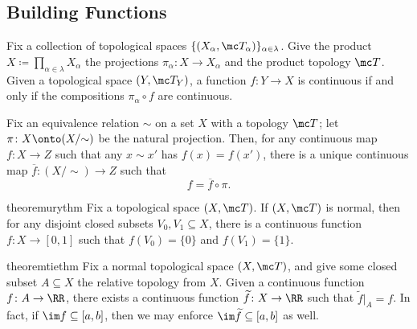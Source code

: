 \documentclass{article}
\begin{document}
\subsection{Building Functions}
\begin{prop}
	Fix a collection of topological spaces $\{(X_\alpha,\mc T_\alpha)\}_{\alpha\in\lambda}$. Give the product $X\coloneqq\prod_{\alpha\in\lambda}X_\alpha$ the projections $\pi_\alpha\colon X\to X_\alpha$ and the product topology $\mc T$. Given a topological space $(Y,\mc T_Y)$, a function $f\colon Y\to X$ is continuous if and only if the compositions $\pi_\alpha\circ f$ are continuous.
\end{prop}
\begin{proposition} \label{prop:quotientup}
	Fix an equivalence relation $\sim$ on a set $X$ with a topology $\mc T$; let $\pi\colon X\onto(X/{\sim})$ be the natural projection. Then, for any continuous map $f\colon X\to Z$ such that any $x\sim x'$ has $f(x)=f(x')$, there is a unique continuous map $\overline f\colon(X/{\sim})\to Z$ such that
	\[f=\overline f\circ\pi.\]
\end{proposition}
\begin{restatable}{theorem}{urythm} \label{thm:ury}
	Fix a topological space $(X,\mc T)$. If $(X,\mc T)$ is normal, then for any disjoint closed subsets $V_0,V_1\subseteq X$, there is a continuous function $f\colon X\to[0,1]$ such that $f(V_0)=\{0\}$ and $f(V_1)=\{1\}$.
\end{restatable}
\begin{restatable}{theorem}{tiethm} \label{thm:tie}
	Fix a normal topological space $(X,\mc T)$, and give some closed subset $A\subseteq X$ the relative topology from $X$. Given a continuous function $f\colon A\to\RR$, there exists a continuous function $\widetilde f\colon X\to\RR$ such that $\widetilde f|_A=f$. In fact, if $\im f\subseteq[a,b]$, then we may enforce $\im\widetilde f\subseteq[a,b]$ as well.
\end{restatable}
\end{document}
